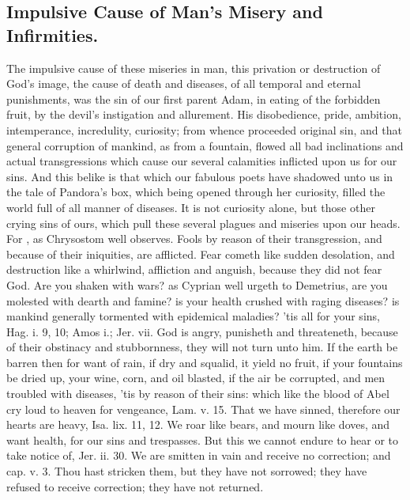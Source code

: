 {\subsection[The Impulsive Cause]{Impulsive Cause of Man's Misery and Infirmities.}
The impulsive cause of these miseries in man, this privation or destruction of God's image, the cause of death and diseases, of all temporal and eternal punishments, was the sin of our first parent Adam, in eating of the forbidden fruit, by the devil's instigation and allurement.
His disobedience, pride, ambition, intemperance, incredulity, curiosity; from whence proceeded original sin, and that general corruption of mankind, as from a fountain, flowed all bad inclinations and actual transgressions which cause our several calamities inflicted upon us for our sins.
And this belike is that which our fabulous poets have shadowed unto us in the tale of  Pandora's box, which being opened through her curiosity, filled the world full of all manner of diseases.
It is not curiosity alone, but those other crying sins of ours, which pull these several plagues and miseries upon our heads.
For , as Chrysostom well observes.
Fools by reason of their transgression, and because of their iniquities, are afflicted.
Fear cometh like sudden desolation, and destruction like a whirlwind, affliction and anguish, because they did not fear God.
Are you shaken with wars? as Cyprian well urgeth to Demetrius, are you molested with dearth and famine? is your health crushed with raging diseases? is mankind generally tormented with epidemical maladies? 'tis all for your sins, Hag. i. 9, 10; Amos i.; Jer. vii.
God is angry, punisheth and threateneth, because of their obstinacy and stubbornness, they will not turn unto him.
If the earth be barren then for want of rain, if dry and squalid, it yield no fruit, if your fountains be dried up, your wine, corn, and oil blasted, if the air be corrupted, and men troubled with diseases, 'tis by reason of their sins: which like the blood of Abel cry loud to heaven for vengeance, Lam. v. 15. That we have sinned, therefore our hearts are heavy, Isa. lix. 11, 12.
We roar like bears, and mourn like doves, and want health, \etc{} for our sins and trespasses.
But this we cannot endure to hear or to take notice of, Jer. ii. 30. We are smitten in vain and receive no correction; and cap. v. 3.
Thou hast stricken them, but they have not sorrowed; they have refused to receive correction; they have not returned.
}
